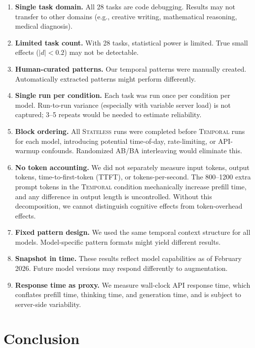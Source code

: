 \documentclass[11pt]{article}
\begin{document}
\begin{enumerate}[nosep]
    \item \textbf{Single task domain.} All 28 tasks are code debugging. Results may not transfer to other domains (e.g., creative writing, mathematical reasoning, medical diagnosis).
    \item \textbf{Limited task count.} With 28 tasks, statistical power is limited. True small effects ($|d| < 0.2$) may not be detectable.
    \item \textbf{Human-curated patterns.} Our temporal patterns were manually created. Automatically extracted patterns might perform differently.
    \item \textbf{Single run per condition.} Each task was run once per condition per model. Run-to-run variance (especially with variable server load) is not captured; 3--5 repeats would be needed to estimate reliability.
    \item \textbf{Block ordering.} All \textsc{Stateless} runs were completed before \textsc{Temporal} runs for each model, introducing potential time-of-day, rate-limiting, or API-warmup confounds. Randomized AB/BA interleaving would eliminate this.
    \item \textbf{No token accounting.} We did not separately measure input tokens, output tokens, time-to-first-token (TTFT), or tokens-per-second. The 800--1200 extra prompt tokens in the \textsc{Temporal} condition mechanically increase prefill time, and any difference in output length is uncontrolled. Without this decomposition, we cannot distinguish cognitive effects from token-overhead effects.
    \item \textbf{Fixed pattern design.} We used the same temporal context structure for all models. Model-specific pattern formats might yield different results.
    \item \textbf{Snapshot in time.} These results reflect model capabilities as of February 2026. Future model versions may respond differently to augmentation.
    \item \textbf{Response time as proxy.} We measure wall-clock API response time, which conflates prefill time, thinking time, and generation time, and is subject to server-side variability.
\end{enumerate}

\section{Conclusion}
\label{sec:conclusion}
\end{document}
